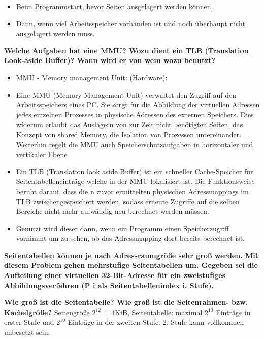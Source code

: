 \documentclass[a4paper]{article}
\begin{document}
\begin{description*}
\begin{itemize}
\begin{itemize}
                  \item Beim Programmstart, bevor Seiten ausgelagert werden können.
                  \item Dann, wenn viel Arbeitsspeicher vorhanden ist und noch überhaupt nicht ausgelagert werden muss.
              \end{itemize}
    \end{itemize}
    \item \textbf{Welche Aufgaben hat eine MMU? Wozu dient ein TLB (Translation Look-aside Buffer)? Wann wird er von wem wozu benutzt?}
    \begin{itemize}
        \item MMU -  Memory management Unit: (Hardware):
        \item Eine MMU (Memory Management Unit) verwaltet den Zugriff auf den Arbeitsspeichers eines PC. Sie sorgt für die Abbildung der virtuellen Adressen jedes einzelnen Prozesses in physische Adressen des externen Speichers. Dies widerum erlaubt das Auslagern von zur Zeit nicht benötigten Seiten, das Konzept von shared Memory, die Isolation von Prozessen untereinander. Weiterhin regelt die MMU auch Speicherschutzaufgaben in horizontaler und vertikaler Ebene
        \item Ein TLB (Translation look aside Buffer) ist ein schneller Cache-Speicher für Seitentabelleneinträge welche in der MMU lokalisiert ist. Die Funktionsweise beruht darauf, dass die n zuvor ermittelten physischen Adressmappings im TLB zwischengespeichert werden, sodass erneute Zugriffe auf die selben Bereiche nicht mehr aufwändig neu berechnet werden müssen.
        \item Genutzt wird dieser dann, wenn ein Programm einen Speicherzugriff vornimmt um zu sehen, ob das Adressmapping dort bereits berechnet ist.
    \end{itemize}
    \item \textbf{Seitentabellen können je nach Adressraumgröße sehr groß werden. Mit diesem Problem gehen mehrstufige Seitentabellen um. Gegeben sei die Aufteilung einer virtuellen 32-Bit-Adresse für ein zweistufiges Abbildungsverfahren (P i als Seitentabellenindex i. Stufe).}
    \begin{itemize*}
        \item \textbf{Wie groß ist die Seitentabelle? Wie groß ist die Seitenrahmen- bzw. Kachelgröße?} Seitengröße $2^{12}$ = 4KiB, Seitentabelle: maximal $2^{10}$ Einträge in erster Stufe und $2^{10}$ Einträge in der zweiten Stufe. 2. Stufe kann vollkommen unbesetzt sein.

\end{itemize*}
\end{description*}
\end{document}

